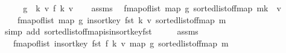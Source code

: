 \begin{isabellebody}
%
\isadelimproof
%
\endisadelimproof
%
\isatagproof
{}\isamarkupfalse%
\ {\isacharminus}{\kern0pt}\isanewline
\ \ \isamarkupfalse%
\ {\isacharquery}{\kern0pt}g\ {\isacharequal}{\kern0pt}\ {\isachardoublequoteopen}{\isasymlambda}{\isacharparenleft}{\kern0pt}k{\isacharcomma}{\kern0pt}\ v{\isacharparenright}{\kern0pt}{\isachardot}{\kern0pt}\ {\isacharparenleft}{\kern0pt}f\ k{\isacharcomma}{\kern0pt}\ v{\isacharparenright}{\kern0pt}{\isachardoublequoteclose}\isanewline
\ \ \isamarkupfalse%
\ assms{\isacharparenleft}{\kern0pt}{}{\isacharparenright}{\kern0pt}\ \isamarkupfalse%
\ {\isachardoublequoteopen}fmap{\isacharunderscore}{\kern0pt}of{\isacharunderscore}{\kern0pt}list\ {\isacharparenleft}{\kern0pt}map\ {\isacharquery}{\kern0pt}g\ {\isacharparenleft}{\kern0pt}sorted{\isacharunderscore}{\kern0pt}list{\isacharunderscore}{\kern0pt}of{\isacharunderscore}{\kern0pt}fmap\ {\isacharparenleft}{\kern0pt}m{\isacharparenleft}{\kern0pt}k\ {\isachardollar}{\kern0pt}{\isachardollar}{\kern0pt}{\isacharcolon}{\kern0pt}{\isacharequal}{\kern0pt}\ v{\isacharparenright}{\kern0pt}{\isacharparenright}{\kern0pt}{\isacharparenright}{\kern0pt}{\isacharparenright}{\kern0pt}\ {\isacharequal}{\kern0pt}\isanewline
\ \ \ \ fmap{\isacharunderscore}{\kern0pt}of{\isacharunderscore}{\kern0pt}list\ {\isacharparenleft}{\kern0pt}map\ {\isacharquery}{\kern0pt}g\ {\isacharparenleft}{\kern0pt}insort{\isacharunderscore}{\kern0pt}key\ fst\ {\isacharparenleft}{\kern0pt}k{\isacharcomma}{\kern0pt}\ v{\isacharparenright}{\kern0pt}\ {\isacharparenleft}{\kern0pt}sorted{\isacharunderscore}{\kern0pt}list{\isacharunderscore}{\kern0pt}of{\isacharunderscore}{\kern0pt}fmap\ m{\isacharparenright}{\kern0pt}{\isacharparenright}{\kern0pt}{\isacharparenright}{\kern0pt}{\isachardoublequoteclose}\isanewline
\ \ \ \ \isamarkupfalse%
\ {\isacharparenleft}{\kern0pt}simp\ add{\isacharcolon}{\kern0pt}\ sorted{\isacharunderscore}{\kern0pt}list{\isacharunderscore}{\kern0pt}of{\isacharunderscore}{\kern0pt}fmap{\isacharunderscore}{\kern0pt}is{\isacharunderscore}{\kern0pt}insort{\isacharunderscore}{\kern0pt}key{\isacharunderscore}{\kern0pt}fst{\isacharparenright}{\kern0pt}\isanewline
\ \ \isamarkupfalse%
\ \isamarkupfalse%
\ assms\ \isamarkupfalse%
\ {\isachardoublequoteopen}{\isasymdots}\ {\isacharequal}{\kern0pt}\ fmap{\isacharunderscore}{\kern0pt}of{\isacharunderscore}{\kern0pt}list\ {\isacharparenleft}{\kern0pt}insort{\isacharunderscore}{\kern0pt}key\ fst\ {\isacharparenleft}{\kern0pt}f\ k{\isacharcomma}{\kern0pt}\ v{\isacharparenright}{\kern0pt}\ {\isacharparenleft}{\kern0pt}map\ {\isacharquery}{\kern0pt}g\ {\isacharparenleft}{\kern0pt}sorted{\isacharunderscore}{\kern0pt}list{\isacharunderscore}{\kern0pt}of{\isacharunderscore}{\kern0pt}fmap\ m{\isacharparenright}{\kern0pt}{\isacharparenright}{\kern0pt}{\isacharparenright}{\kern0pt}{\isachardoublequoteclose}\isanewline

\end{isabellebody}
